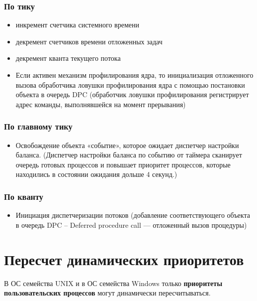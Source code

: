 \subsection*{По тику}
\begin{itemize}
	\item инкремент счетчика системного времени
	\item декремент счетчиков времени отложенных задач
	\item декремент кванта текущего потока %
	\item Если активен механизм профилирования ядра, то инициализация отложенного вызова обработчика ловушки профилирования ядра с помощью постановки объекта в очередь DPC (обработчик ловушки профилирования регистрирует адрес команды, выполнявшейся на момент прерывания)
\end{itemize}

\subsection*{По главному тику}
\begin{itemize}
	\item Освобождение объекта «событие», которое ожидает диспетчер настройки баланса. (Диспетчер настройки баланса по событию от таймера сканирует очередь готовых процессов и повышает приоритет процессов, которые находились в состоянии ожидания дольше 4 секунд.)
\end{itemize}

\subsection*{По кванту}
\begin{itemize}
	\item Инициация диспетчеризации потоков (добавление соответствующего объекта в очередь DPC -- Deferred procedure call — отложенный вызов процедуры)
\end{itemize}

\chapter{Пересчет динамических приоритетов}

В ОС семейства UNIX и в ОС семейства Windows только \textbf{приоритеты пользовательских 	процессов} могут динамически пересчитываться.
